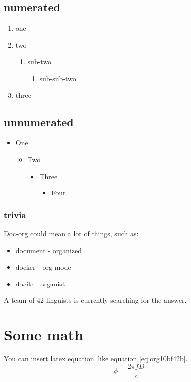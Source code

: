\subsection{numerated}
\label{sec:org1fc6d9b}
\begin{enumerate}
\item one
\item two
\begin{enumerate}
\item sub-two
\begin{enumerate}
\item sub-sub-two
\end{enumerate}
\end{enumerate}
\item three
\end{enumerate}

\subsection{unnumerated}
\label{sec:orgb5d196e}
\begin{itemize}
\item One
\begin{itemize}
\item Two
\begin{itemize}
\item Three
\begin{itemize}
\item Four
\end{itemize}
\end{itemize}
\end{itemize}
\end{itemize}

\subsubsection{trivia}
\label{sec:org7a453b9}
Doc-org could mean a lot of things, such as:
\begin{itemize}
\item document - organized
\item docker - org mode
\item docile - organist
\end{itemize}
A team of 42 linguists is currently searching for the answer.

\section{Some math}
\label{sec:org8b0eadb}
You can insert latex equation, like equation \ref{eq:org10bf42b}.
\begin{equation}
\label{eq:org10bf42b}
\phi = \frac{2\pi fD}{c}
\end{equation}

